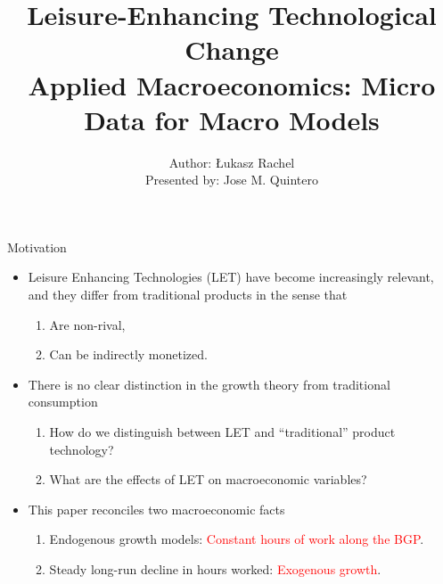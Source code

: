 \documentclass[usenames,dvipsnames,aspectratio=169]{beamer}
\title{Leisure-Enhancing Technological Change  \\ \small{Applied Macroeconomics: Micro Data for Macro Models} }
\author{Author: Łukasz Rachel \\ 
Presented by: Jose M. Quintero}
\begin{document}
\begin{frame}
  \titlepage
\end{frame}

\begin{frame}{Motivation}\label{p1:Int}
\begin{itemize}
    \item Leisure Enhancing Technologies (LET) have become increasingly relevant, and they differ from traditional products in the sense that \hyperlink{p1:Mot}{}
    \begin{enumerate}
        \item Are non-rival,
        \item Can be indirectly monetized. 
    \end{enumerate}
    \pause
    \item There is no clear distinction in the growth theory from traditional consumption 
    \begin{enumerate}
        \item How do we distinguish between LET and ``traditional'' product technology?
        \item What are the effects of LET on macroeconomic variables? 
    \end{enumerate}
    \pause 
    \item This paper reconciles two macroeconomic facts 
    \begin{enumerate}
        \item Endogenous growth models: \textcolor{red}{Constant hours of work along the BGP}.  
        \item Steady long-run decline in hours worked: \textcolor{red}{Exogenous growth}.
    \end{enumerate}
\end{itemize}
\end{frame}
\end{document}
